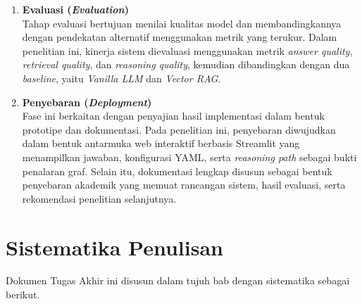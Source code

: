 \begin{enumerate}
    \item \textbf{Evaluasi (\textit{Evaluation})} \\
    Tahap evaluasi bertujuan menilai kualitas model dan membandingkannya dengan pendekatan alternatif menggunakan metrik yang terukur. Dalam penelitian ini, kinerja sistem dievaluasi menggunakan metrik \textit{answer quality}, \textit{retrieval quality}, dan \textit{reasoning quality}, kemudian dibandingkan dengan dua \textit{baseline}, yaitu \textit{Vanilla LLM} dan \textit{Vector RAG}.

    \item \textbf{Penyebaran (\textit{Deployment})} \\
    Fase ini berkaitan dengan penyajian hasil implementasi dalam bentuk prototipe dan dokumentasi. Pada penelitian ini, penyebaran diwujudkan dalam bentuk antarmuka web interaktif berbasis Streamlit yang menampilkan jawaban, konfigurasi YAML, serta \textit{reasoning path} sebagai bukti penalaran graf. Selain itu, dokumentasi lengkap disusun sebagai bentuk penyebaran akademik yang memuat rancangan sistem, hasil evaluasi, serta rekomendasi penelitian selanjutnya.
\end{enumerate}

\section{Sistematika Penulisan}
Dokumen Tugas Akhir ini disusun dalam tujuh bab dengan sistematika sebagai berikut.

